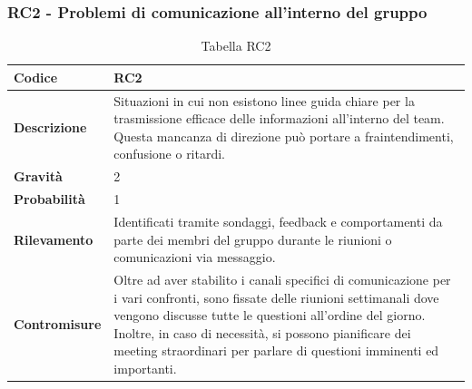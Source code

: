 \documentclass{article}
\begin{document}
    \subsubsection{RC2 - Problemi di comunicazione all’interno del gruppo}
    \begin{table}[H]
        \renewcommand{\arraystretch}{1.5}
        \centering
        \begin{tabular}{|p{3cm}|p{11cm}|}
            \hline
            \textbf{Codice} & RC2 \\
            \hline
            \textbf{Descrizione} & Situazioni in cui non esistono linee guida chiare per la trasmissione efficace delle informazioni all’interno del team. Questa mancanza di direzione può portare a fraintendimenti, confusione o ritardi. \\
            \hline
            \textbf{Gravità} & 2 \\
            \hline
            \textbf{Probabilità} & 1 \\
            \hline
            \textbf{Rilevamento} & Identificati tramite sondaggi, feedback e comportamenti da parte dei membri del gruppo durante le riunioni o comunicazioni via messaggio. \\
            \hline
            \textbf{Contromisure} & Oltre ad aver stabilito i canali specifici di comunicazione per i vari confronti, sono fissate delle riunioni settimanali dove vengono discusse tutte le questioni all’ordine del giorno. Inoltre, in caso di necessità, si possono pianificare dei meeting straordinari per parlare di questioni imminenti ed importanti. \\
            \hline
        \end{tabular}
        \caption{Tabella RC2}
    \end{table}
\end{document}
